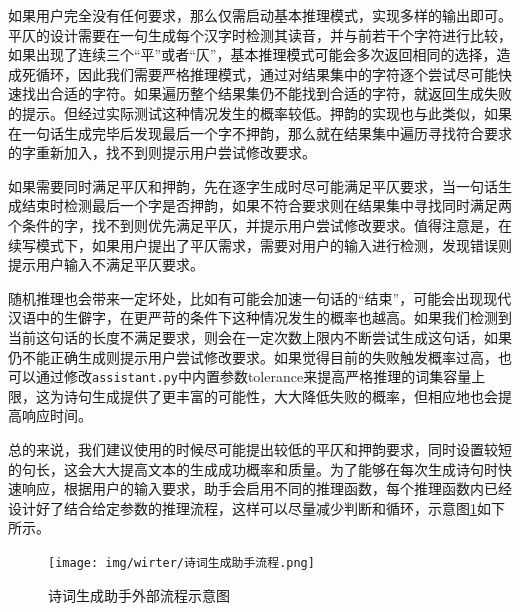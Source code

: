 如果用户完全没有任何要求，那么仅需启动基本推理模式，实现多样的输出即可。平仄的设计需要在一句生成每个汉字时检测其读音，并与前若干个字符进行比较，如果出现了连续三个“平”或者“仄”，基本推理模式可能会多次返回相同的选择，造成死循环，因此我们需要严格推理模式，通过对结果集中的字符逐个尝试尽可能快速找出合适的字符。如果遍历整个结果集仍不能找到合适的字符，就返回生成失败的提示。但经过实际测试这种情况发生的概率较低。押韵的实现也与此类似，如果在一句话生成完毕后发现最后一个字不押韵，那么就在结果集中遍历寻找符合要求的字重新加入，找不到则提示用户尝试修改要求。

如果需要同时满足平仄和押韵，先在逐字生成时尽可能满足平仄要求，当一句话生成结束时检测最后一个字是否押韵，如果不符合要求则在结果集中寻找同时满足两个条件的字，找不到则优先满足平仄，并提示用户尝试修改要求。值得注意是，在续写模式下，如果用户提出了平仄需求，需要对用户的输入进行检测，发现错误则提示用户输入不满足平仄要求。

随机推理也会带来一定坏处，比如有可能会加速一句话的“结束”，可能会出现现代汉语中的生僻字，在更严苛的条件下这种情况发生的概率也越高。如果我们检测到当前这句话的长度不满足要求，则会在一定次数上限内不断尝试生成这句话，如果仍不能正确生成则提示用户尝试修改要求。如果觉得目前的失败触发概率过高，也可以通过修改\texttt{assistant.py}中内置参数tolerance来提高严格推理的词集容量上限，这为诗句生成提供了更丰富的可能性，大大降低失败的概率，但相应地也会提高响应时间。

总的来说，我们建议使用的时候尽可能提出较低的平仄和押韵要求，同时设置较短的句长，这会大大提高文本的生成成功概率和质量。为了能够在每次生成诗句时快速响应，根据用户的输入要求，助手会启用不同的推理函数，每个推理函数内已经设计好了结合给定参数的推理流程，这样可以尽量减少判断和循环，示意图\ref{fig:iwslt-wmt3}如下所示。

\begin{figure}[h]
    \centering
    \texttt{[image: img/wirter/诗词生成助手流程.png]}
    \caption{诗词生成助手外部流程示意图}
    \label{fig:iwslt-wmt3}
\end{figure}


